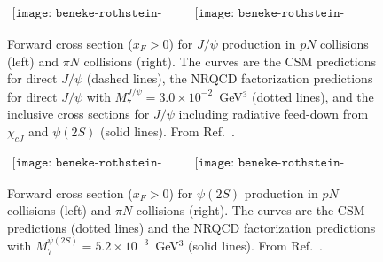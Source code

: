 \begin{figure}[htb]
\begin{center}
$ \begin{array}{cc}
\texttt{[image: beneke-rothstein-psi.eps]}
&
\texttt{[image: beneke-rothstein-psipi.eps]}
\end{array} $
\caption{
Forward cross section ($x_F>0$) for $J/\psi$ production 
in $pN$ collisions (left) and $\pi N$ collisions (right).  
The curves are the CSM predictions for direct $J/\psi$ (dashed lines), 
the NRQCD factorization predictions for direct $J/\psi$ with 
$M_7^{J/\psi}=3.0\times 10^{-2}$~GeV$^3$ (dotted lines), 
and the inclusive cross sections for $J/\psi$ including 
radiative feed-down from $\chi_{cJ}$ and $\psi(2S)$ 
(solid lines).  From Ref.~\cite{Beneke:1996tk}.
}
\label{fig:fixed-target-psi}
\end{center}
\end{figure}

\begin{figure}[htb]
\begin{center}
$ \begin{array}{cc}
\texttt{[image: beneke-rothstein-pri.eps]} 
&
\texttt{[image: beneke-rothstein-pripi.eps]}
\end{array} $
\caption{
Forward cross section ($x_F>0$) for $\psi(2S)$ production 
in $pN$ collisions (left) and $\pi N$ collisions (right).  
The curves are the CSM predictions (dotted lines) 
and the NRQCD factorization predictions with 
$M_7^{\psi(2S)}=5.2\times 10^{-3}$~GeV$^3$ (solid lines).  
From Ref.~\cite{Beneke:1996tk}.
}
\label{fig:fixed-target-pri}
\end{center}
\end{figure}

